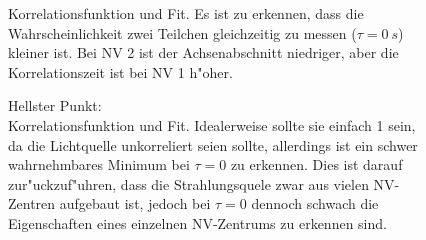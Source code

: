 \begin{figure}[htbp]
    \centering
    \begin{subfigure}{0.49\textwidth}
        \centering
        
        \label{fig:g12:1}
    \end{subfigure}
    \hfill
    \begin{subfigure}{0.49\textwidth}
        \centering
        
        \label{fig:g12:2}
    \end{subfigure}
    \caption{
        Korrelationsfunktion und Fit.
        Es ist zu erkennen, dass die Wahrscheinlichkeit zwei Teilchen gleichzeitig zu messen ($\tau=\SI{0}{s}$) kleiner ist.
        Bei NV 2 ist der Achsenabschnitt niedriger, aber die Korrelationszeit ist bei NV 1 h"oher.
    }
    \label{fig:g12}
\end{figure}

\begin{figure}[htbp]
    \centering
    
    \caption{
        Hellster Punkt:
        \\
        Korrelationsfunktion und Fit.
        Idealerweise sollte sie einfach 1 sein, da die Lichtquelle unkorreliert seien sollte, allerdings ist ein schwer wahrnehmbares Minimum bei $\tau=0$ zu erkennen.
        Dies ist darauf zur"uckzuf"uhren, dass die Strahlungsquele zwar aus vielen NV-Zentren aufgebaut ist, jedoch bei $\tau=0$ dennoch schwach die Eigenschaften eines einzelnen NV-Zentrums zu erkennen sind.
    }
    \label{fig:g3}
\end{figure}
